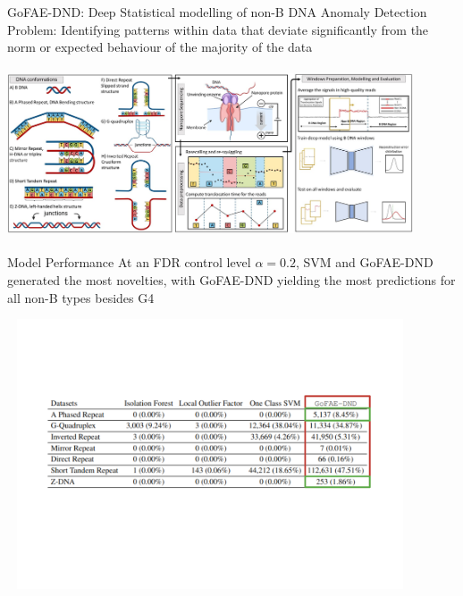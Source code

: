 \documentclass{beamer}
\begin{document}
	\begin{frame}{GoFAE-DND: Deep Statistical modelling of non-B DNA}
		Anomaly Detection Problem: Identifying patterns within data that deviate significantly from the norm or expected behaviour of the majority of the data
		\begin{center}
		\includegraphics[width=12cm, height=5cm]{gofae.jpeg}
		\end{center}
	\end{frame}

	\begin{frame}{Model Performance}
		At an FDR control level $\alpha = 0.2$, SVM and GoFAE-DND generated the most novelties, with GoFAE-DND yielding the most predictions for all non-B types besides G4
		\begin{center}
			\vspace{-1cm}
			\includegraphics[width=12cm, height=8cm]{model_performance_gofae.png}
		\end{center}
		
		
	\end{frame}
\end{document}
